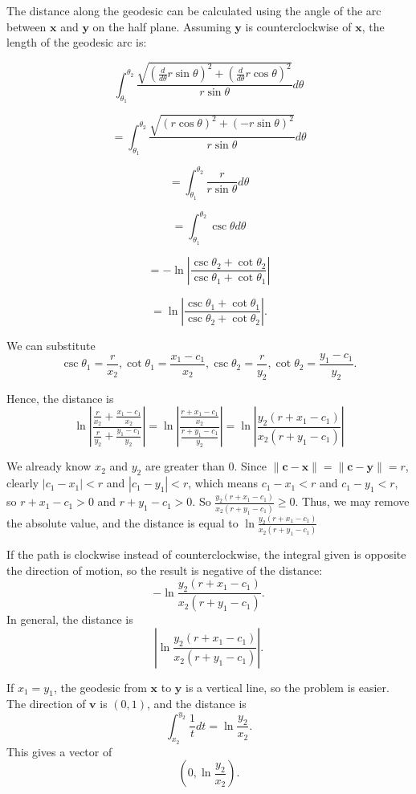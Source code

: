 The distance along the geodesic can be calculated using the angle of the arc between $\textbf{x}$ and $\textbf{y}$ on the half plane. Assuming $\textbf{y}$ is counterclockwise of $\textbf{x}$, the length of the geodesic arc is:

$$\int_{\theta_1}^{\theta_2} \frac{\sqrt{(\frac{d}{d\theta}r\sin\theta)^2+(\frac{d}{d\theta}r\cos\theta)^2}}{r\sin\theta} d\theta$$

$$= \int_{\theta_1}^{\theta_2} \frac{\sqrt{(r\cos\theta)^2+(-r\sin\theta)^2}}{r\sin\theta} d\theta$$

$$= \int_{\theta_1}^{\theta_2} \frac{r}{r\sin\theta} d\theta$$

$$= \int_{\theta_1}^{\theta_2} \csc\theta d\theta$$

$$= -\ln\left|\frac{\csc\theta_2+\cot\theta_2}{\csc\theta_1+\cot\theta_1}\right|$$

$$= \ln\left|\frac{\csc\theta_1+\cot\theta_1}{\csc\theta_2+\cot\theta_2}\right|.$$

We can substitute $$\csc\theta_1 = \frac{r}{x_2}, \cot\theta_1 = \frac{x_1-c_1}{x_2}, \csc\theta_2 = \frac{r}{y_2}, \cot\theta_2 = \frac{y_1-c_1}{y_2}.$$

Hence, the distance is $$\ln\left|\frac{\frac{r}{x_2}+\frac{x_1-c_1}{x_2}}{\frac{r}{y_2}+\frac{y_1-c_1}{y_2}}\right| = \ln\left|\frac{\frac{r+x_1-c_1}{x_2}}{\frac{r+y_1-c_1}{y_2}}\right| = \ln\left|\frac{y_2(r+x_1-c_1)}{x_2(r+y_1-c_1)}\right|$$

We already know $x_2$ and $y_2$ are greater than $0$. Since $\|\textbf{c}-\textbf{x}\| = \|\textbf{c}-\textbf{y}\| = r$, clearly $|c_1-x_1| < r$ and $|c_1-y_1| < r$, which means $c_1-x_1 < r$ and $c_1-y_1 < r$, so $r+x_1-c_1 > 0$ and $r+y_1-c_1 > 0$. So $\displaystyle\frac{y_2(r+x_1-c_1)}{x_2(r+y_1-c_1)} \geq 0$. Thus, we may remove the absolute value, and the distance is equal to $\displaystyle\ln\frac{y_2(r+x_1-c_1)}{x_2(r+y_1-c_1)}$

If the path is clockwise instead of counterclockwise, the integral given is opposite the direction of motion, so the result is negative of the distance: $$-\ln\frac{y_2(r+x_1-c_1)}{x_2(r+y_1-c_1)}.$$ In general, the distance is $$\left|\ln\frac{y_2(r+x_1-c_1)}{x_2(r+y_1-c_1)}\right|.$$

If $x_1 = y_1$, the geodesic from $\textbf{x}$ to $\textbf{y}$ is a vertical line, so the problem is easier. The direction of $\textbf{v}$ is $(0,1)$, and the distance is $$\int_{x_2}^{y_2} \frac{1}{t} dt = \ln\frac{y_2}{x_2}.$$ This gives a vector of $$\left(0,\ln\frac{y_2}{x_2}\right).$$

